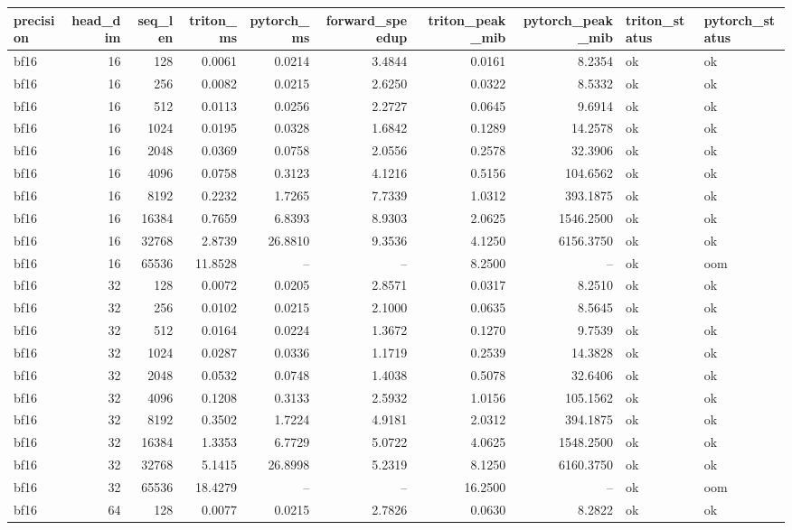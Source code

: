 \begin{tabular}{lrrrrrrrll}
\toprule
precision & head\_dim & seq\_len & triton\_ms & pytorch\_ms & forward\_speedup & triton\_peak\_mib & pytorch\_peak\_mib & triton\_status & pytorch\_status \\
\midrule
bf16 & 16 & 128 & 0.0061 & 0.0214 & 3.4844 & 0.0161 & 8.2354 & ok & ok \\
bf16 & 16 & 256 & 0.0082 & 0.0215 & 2.6250 & 0.0322 & 8.5332 & ok & ok \\
bf16 & 16 & 512 & 0.0113 & 0.0256 & 2.2727 & 0.0645 & 9.6914 & ok & ok \\
bf16 & 16 & 1024 & 0.0195 & 0.0328 & 1.6842 & 0.1289 & 14.2578 & ok & ok \\
bf16 & 16 & 2048 & 0.0369 & 0.0758 & 2.0556 & 0.2578 & 32.3906 & ok & ok \\
bf16 & 16 & 4096 & 0.0758 & 0.3123 & 4.1216 & 0.5156 & 104.6562 & ok & ok \\
bf16 & 16 & 8192 & 0.2232 & 1.7265 & 7.7339 & 1.0312 & 393.1875 & ok & ok \\
bf16 & 16 & 16384 & 0.7659 & 6.8393 & 8.9303 & 2.0625 & 1546.2500 & ok & ok \\
bf16 & 16 & 32768 & 2.8739 & 26.8810 & 9.3536 & 4.1250 & 6156.3750 & ok & ok \\
bf16 & 16 & 65536 & 11.8528 & -- & -- & 8.2500 & -- & ok & oom \\
bf16 & 32 & 128 & 0.0072 & 0.0205 & 2.8571 & 0.0317 & 8.2510 & ok & ok \\
bf16 & 32 & 256 & 0.0102 & 0.0215 & 2.1000 & 0.0635 & 8.5645 & ok & ok \\
bf16 & 32 & 512 & 0.0164 & 0.0224 & 1.3672 & 0.1270 & 9.7539 & ok & ok \\
bf16 & 32 & 1024 & 0.0287 & 0.0336 & 1.1719 & 0.2539 & 14.3828 & ok & ok \\
bf16 & 32 & 2048 & 0.0532 & 0.0748 & 1.4038 & 0.5078 & 32.6406 & ok & ok \\
bf16 & 32 & 4096 & 0.1208 & 0.3133 & 2.5932 & 1.0156 & 105.1562 & ok & ok \\
bf16 & 32 & 8192 & 0.3502 & 1.7224 & 4.9181 & 2.0312 & 394.1875 & ok & ok \\
bf16 & 32 & 16384 & 1.3353 & 6.7729 & 5.0722 & 4.0625 & 1548.2500 & ok & ok \\
bf16 & 32 & 32768 & 5.1415 & 26.8998 & 5.2319 & 8.1250 & 6160.3750 & ok & ok \\
bf16 & 32 & 65536 & 18.4279 & -- & -- & 16.2500 & -- & ok & oom \\
bf16 & 64 & 128 & 0.0077 & 0.0215 & 2.7826 & 0.0630 & 8.2822 & ok & ok \\

\end{tabular}
